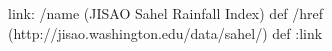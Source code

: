 \begin{ingrid}
link:
/name (JISAO Sahel Rainfall Index) def
/href (http://jisao.washington.edu/data/sahel/) def
:link
\end{ingrid}

